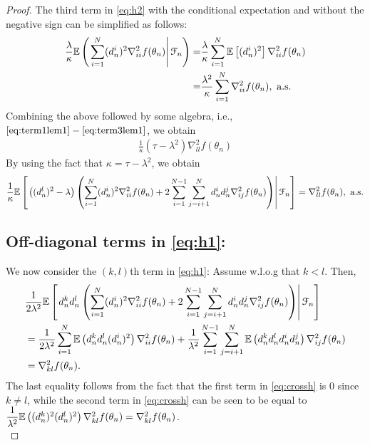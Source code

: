 \begin{proof}
The third term in \eqref{eq:h2} with the conditional expectation and without the negative sign can be simplified as follows: 
\begin{align}\label{eq:term3lem1}
\dfrac{ \lambda}{\kappa} \mathbb{E}\left(\left. \sum\limits_{i=1}^N (d_n^i)^2 \nabla^2_{ii} f(\theta_n) \right| \mathcal{F}_n\right)
= &\dfrac{ \lambda}{\kappa} \sum\limits_{i=1}^N \mathbb{E} \left[(d_n^i)^2\right] \nabla^2_{ii} f(\theta_n) \nonumber \\
=  &\dfrac{\lambda^2}{\kappa} \sum\limits_{i=1}^N \nabla^2_{ii} f(\theta_n), \text{ a.s.}
\end{align} 
Combining the above followed by some algebra, i.e., $\eqref{eq:term1lem1}-\eqref{eq:term3lem1}$, we obtain
\begin{align*}
\frac{1}{\kappa} (\tau - \lambda^2) \nabla^2_{ll} f(\theta_n)
\end{align*} 
By using the fact that $\kappa = \tau - \lambda^2$, we obtain
\begin{align*}
\dfrac{1}{\kappa}  \mathbb{E}\left[\left. \left((d_n^l)^2-\lambda\right) \left(\sum\limits_{i=1}^N (d_n^i)^2 \nabla^2_{ii} f(\theta_n) 
+ 2\sum\limits_{i=1}^{N-1}\sum\limits_{j=i+1}^N d_n^i d_n^j \nabla^2_{ij} f(\theta_n)\right)\right| \mathcal{F}_n\right] = \nabla^2_{ll} f(\theta_n), \text{ a.s.}
\end{align*}

\subsection*{Off-diagonal terms in \eqref{eq:h1}:}

We now consider the $(k,l)$th term in \eqref{eq:h1}: Assume w.l.o.g that $k<l$. Then,
\begin{align}
 &\dfrac{1}{2 \lambda^2} \mathbb{E}\left[\left.d_n^k d_n^l \left(\sum\limits_{i=1}^N (d_n^i)^2 \nabla^2_{ii} f(\theta_n)  
+ 2\sum\limits_{i=1}^{N-1}\sum\limits_{j=i+1}^N d_n^i d_n^j \nabla^2_{ij} f(\theta_n)\right)\right| \mathcal{F}_n \right] \nonumber\\
&=\dfrac{1}{2 \lambda^2} \sum\limits_{i=1}^N \mathbb{E} \left(d_n^k d_n^l (d_n^i)^2 \right)\nabla^2_{ii} f(\theta_n) + \dfrac{1}{\lambda^2}\sum\limits_{i=1}^{N-1}\sum\limits_{j=i+1}^N \mathbb{E}\left(d_n^k d_n^l d_n^i d_n^j\right) \nabla^2_{ij} f(\theta_n) \label{eq:crossh}\\
&=  \nabla^2_{kl} f(\theta_n).\nonumber
\end{align}
The last equality follows from the fact that the first term in \eqref{eq:crossh} is $0$ since $k\ne l$, while the second term in \eqref{eq:crossh} can be seen to be equal to $\dfrac{1}{\lambda^2} \mathbb{E}\left((d_n^k)^2 (d_n^l)^2\right) \nabla^2_{kl} f(\theta_n) = \nabla^2_{kl} f(\theta_n)$. \\
\end{proof}



